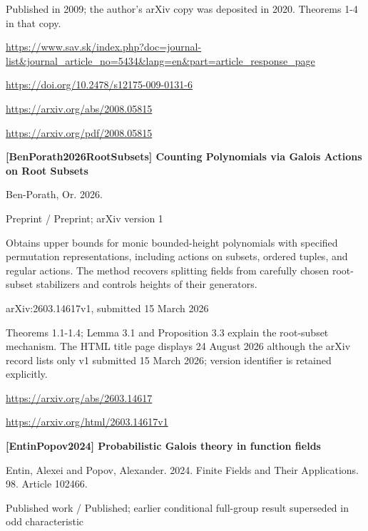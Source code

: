 \documentclass[11pt,a4paper,oneside,openany]{book}
\begin{document}
{\small Published in 2009; the author's arXiv copy was deposited in 2020. Theorems 1-4 in that copy.}\par
{\footnotesize\url{https://www.sav.sk/index.php?doc=journal-list&journal_article_no=5434&lang=en&part=article_response_page}}\par
{\footnotesize\url{https://doi.org/10.2478/s12175-009-0131-6}}\par
{\footnotesize\url{https://arxiv.org/abs/2008.05815}}\par
{\footnotesize\url{https://arxiv.org/pdf/2008.05815}}\par
\vspace{9pt}
\hypertarget{ref:BenPorath2026RootSubsets}{}
{\sffamily\bfseries\color{atlasgreen}[BenPorath2026RootSubsets] Counting Polynomials via Galois Actions on Root Subsets}\par
\color{black} Ben-Porath, Or. 2026.\par
{\small\sffamily\color{atlasgold}Preprint / Preprint; arXiv version 1}\par
\color{black} Obtains upper bounds for monic bounded-height polynomials with specified permutation representations, including actions on subsets, ordered tuples, and regular actions. The method recovers splitting fields from carefully chosen root-subset stabilizers and controls heights of their generators.\par
{\small arXiv:2603.14617v1, submitted 15 March 2026}\par
{\small Theorems 1.1-1.4; Lemma 3.1 and Proposition 3.3 explain the root-subset mechanism. The HTML title page displays 24 August 2026 although the arXiv record lists only v1 submitted 15 March 2026; version identifier is retained explicitly.}\par
{\footnotesize\url{https://arxiv.org/abs/2603.14617}}\par
{\footnotesize\url{https://arxiv.org/html/2603.14617v1}}\par
\vspace{9pt}
\hypertarget{ref:EntinPopov2024}{}
{\sffamily\bfseries\color{atlasgreen}[EntinPopov2024] Probabilistic Galois theory in function fields}\par
\color{black} Entin, Alexei and Popov, Alexander. 2024. Finite Fields and Their Applications. 98. Article 102466.\par
{\small\sffamily\color{atlasgold}Published work / Published; earlier conditional full-group result superseded in odd characteristic}\par
\end{document}
